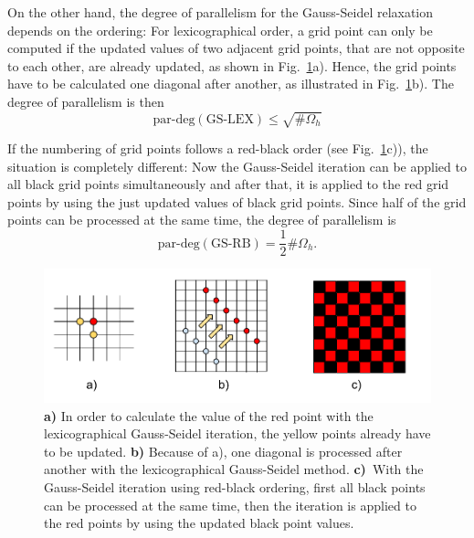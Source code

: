 On the other hand, the degree of parallelism for the Gauss-Seidel relaxation depends on the ordering: For lexicographical order, a grid point can only be computed if the updated values of two adjacent grid points, that are not opposite to each other, are already updated, as shown in Fig.~\ref{fig:mg_parallel_properties}a). Hence, the grid points have to be calculated one diagonal after another, as illustrated in Fig.~\ref{fig:mg_parallel_properties}b). The degree of parallelism is then
\begin{equation}
\text{par-deg}(\textrm{GS-LEX}) \leq \sqrt{\#\Omega_h}
\end{equation}

If the numbering of grid points follows a red-black order (see Fig.~\ref{fig:mg_parallel_properties}c)), the situation is completely different: Now the Gauss-Seidel iteration can be applied to all black grid points simultaneously and after that, it is applied to the red grid points by using the just updated values of black grid points. Since half of the grid points can be processed at the same time, the degree of parallelism is 
\begin{equation}
\text{par-deg}(\textrm{GS-RB}) = \frac{1}{2} \#\Omega_h.
\end{equation}



\begin{figure}[h]
	\centering
	\includegraphics[width=1.\textwidth]{chapters/chapter02/mg_parallel_properties}
	\caption{\textbf{a)} In order to calculate the value of the red point with the lexicographical Gauss-Seidel iteration, the yellow points already have to be updated. \textbf{b)} Because of a), one diagonal is processed after another with the lexicographical Gauss-Seidel method. \textbf{c)}~With the Gauss-Seidel iteration using red-black ordering, first all black points can be processed at the same time, then the iteration is applied to the red points by using the updated black point values.}
	\label{fig:mg_parallel_properties}
\end{figure}

